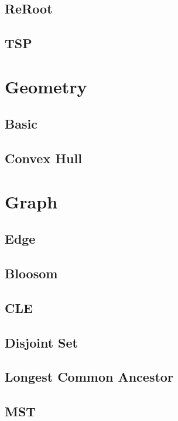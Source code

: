 \subsection{ReRoot}

\subsection{TSP}


\section{Geometry}

\subsection{Basic}

\subsection{Convex Hull}


\section{Graph}

\subsection{Edge}

\subsection{Bloosom}

\subsection{CLE}

\subsection{Disjoint Set}

\subsection{Longest Common Ancestor}

\subsection{MST}

